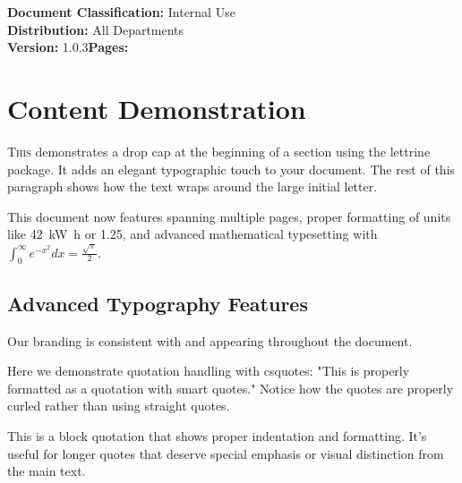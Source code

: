 \documentclass[a4paper,11pt,xetex]{article}
\newcommand{\companyName}{Lagen}
\newcommand{\documentVersion}{1.0.3}
\newcommand{\documentClassification}{Internal Use}
\begin{document}
\vfill
\begin{center}
\color{textgray}\footnotesize\sffamily
\textbf{Document Classification:} \documentClassification\\
\textbf{Distribution:} All Departments\\
\textbf{Version:} \documentVersion \quad \textbf{Pages:} \pageref{LastPage}
\end{center}

\newpage

\tableofcontents
\newpage


\section{Content Demonstration}
\label{sec:demonstration}

\lettrine[lines=3, loversize=0.1]{T}{his} demonstrates a drop cap at the beginning of a section using the lettrine package. It adds an elegant typographic touch to your document. The rest of this paragraph shows how the text wraps around the large initial letter.

This document now features  spanning multiple pages, proper formatting of units like \SI{42}{\kilo\watt\hour} or \SI{1.25}{\USD}, and advanced mathematical typesetting with $\displaystyle\int_{0}^{\infty} e^{-x^2} dx = \frac{\sqrt{\pi}}{2}$.

\subsection{Advanced Typography Features}

Our branding is consistent with \brandname{\companyName} and  appearing throughout the document. 

Here we demonstrate quotation handling with csquotes: "This is properly formatted as a quotation with smart quotes." Notice how the quotes are properly curled rather than using straight quotes.

\begin{displayquote}
This is a block quotation that shows proper indentation and formatting. It's useful for longer quotes that deserve special emphasis or visual distinction from the main text.
\end{displayquote}
\end{document}
